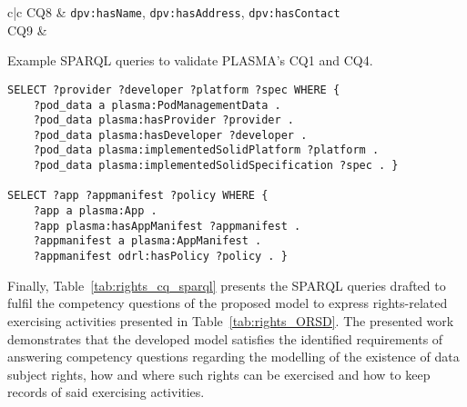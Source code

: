 \begin{table}[htp]
\begin{tabular}{c|c}
        \hline
        CQ8 & \texttt{dpv:hasName}, \texttt{dpv:hasAddress}, \texttt{dpv:hasContact} \\
        \hline
        CQ9 &  \\
    \end{tabular}
\end{table}

\begin{listing}[htp]
\caption{Example SPARQL queries to validate PLASMA's CQ1 and CQ4.}
\label{list:plasma_sparql_cq}
\begin{verbatim}
SELECT ?provider ?developer ?platform ?spec WHERE {
    ?pod_data a plasma:PodManagementData . 
    ?pod_data plasma:hasProvider ?provider . 
    ?pod_data plasma:hasDeveloper ?developer .
    ?pod_data plasma:implementedSolidPlatform ?platform .
    ?pod_data plasma:implementedSolidSpecification ?spec . }

SELECT ?app ?appmanifest ?policy WHERE {
    ?app a plasma:App . 
    ?app plasma:hasAppManifest ?appmanifest . 
    ?appmanifest a plasma:AppManifest .
    ?appmanifest odrl:hasPolicy ?policy . }
\end{verbatim}
\end{listing}

Finally, Table~\ref{tab:rights_cq_sparql} presents the SPARQL queries drafted to fulfil the competency questions of the proposed model to express rights-related exercising activities presented in Table~\ref{tab:rights_ORSD}.
The presented work demonstrates that the developed model satisfies the identified requirements of answering competency questions regarding the modelling of the existence of data subject rights, how and where such rights can be exercised and how to keep records of said exercising activities.

